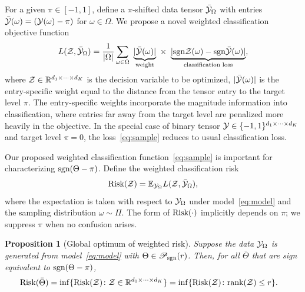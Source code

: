 \documentclass[twoside,11pt]{article}
\theoremstyle{plain}
\newtheorem{prop}{Proposition}
\theoremstyle{definition}
\newcommand*{\KeepStyleUnderBrace}[1]{%
  \mathop{%
    \mathchoice
    {\underbrace{\displaystyle#1}}%
    {\underbrace{\textstyle#1}}%
    {\underbrace{\scriptstyle#1}}%
    {\underbrace{\scriptscriptstyle#1}}%
  }\limits
}
\def\sign{\textup{sgn}}
\def\caliP{\mathscr{P}_{\textup{sgn}}}
\begin{document}
For a given $\pi \in [-1,1]$, define a $\pi$-shifted data tensor $\bar {\mathcal{Y}}_\Omega$ with entries $\bar {\mathcal{Y}}(\omega) = (\mathcal{Y}(\omega)-\pi)$ for $\omega\in \Omega$. We propose a novel weighted classification objective function
\begin{equation}\label{eq:sample}
L(\tZ, \bar \tY_\Omega)= {1\over |\Omega|}\sum_{\omega \in \Omega}\ \KeepStyleUnderBrace{|\bar \tY(\omega)|}_{\text{weight}}\  \times \ \KeepStyleUnderBrace{| \sign \tZ(\omega)-\sign \bar \tY(\omega)|}_{\text{classification loss}},
\end{equation}
where $\mathcal{Z}\in\mathbb{R}^{d_1\times \cdots \times d_K}$ is the decision variable to be optimized, $|\bar {\mathcal{Y}}(\omega)|$ is the entry-specific weight equal to the distance from the tensor entry to the target level $\pi$. The entry-specific weights incorporate the magnitude information into classification, where entries far away from the target level are penalized more heavily in the objective.  In the special case of binary tensor $\mathcal{Y}\in\{-1,1\}^{d_1\times\cdots\times d_K}$ and target level $\pi=0$, the loss~\eqref{eq:sample} reduces to usual classification loss.  

Our proposed weighted classification function~\eqref{eq:sample} is important for characterizing $\sign(\Theta-\pi)$. Define the weighted classification risk 
\begin{equation}\label{eq:population}
\textup{Risk}(\mathcal{Z})=\mathbb{E}_{\mathcal{Y}_\Omega}L(\mathcal{Z},\bar{\mathcal{Y}}_\Omega),
\end{equation}
where the expectation is taken with respect to $\mathcal{Y}_\Omega$ under model~\eqref{eq:model} and the sampling distribution $\omega\sim\Pi$. %
The form of $\textup{Risk}(\cdot)$ implicitly depends on $\pi$; we suppress $\pi$ when no confusion arises. 

\begin{prop}[Global optimum of weighted risk]\label{prop:global}
Suppose the data $\mathcal{Y}_\Omega$ is generated from model~\eqref{eq:model} with $\Theta \in \caliP(r)$. Then, for all $\bar \Theta$ that are sign equivalent to $\sign(\Theta-\pi)$, 
\begin{align}\label{eq:optimal}
\textup{Risk}(\bar \Theta )&=\inf\{\textup{Risk}(\mathcal{Z})\colon \mathcal{Z}\in\mathbb{R}^{d_1\times \cdots \times d_K}\}
=\inf\{\textup{Risk}(\mathcal{Z})\colon \textup{rank} (\mathcal{Z})\leq r\}.
\end{align}
\end{prop}
\end{document}
